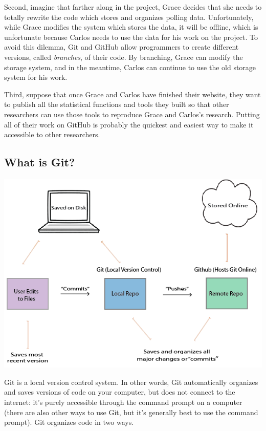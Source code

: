 \documentclass[
]{book}
\begin{document}
Second, imagine that farther along in the project, Grace decides that she needs to totally rewrite the code which stores and organizes polling data. Unfortunately, while Grace modifies the system which stores the data, it will be offline, which is unfortunate because Carlos needs to use the data for his work on the project. To avoid this dilemma, Git and GitHub allow programmers to create different versions, called \emph{branches}, of their code. By branching, Grace can modify the storage system, and in the meantime, Carlos can continue to use the old storage system for his work.

Third, suppose that once Grace and Carlos have finished their website, they want to publish all the statistical functions and tools they built so that other researchers can use those tools to reproduce Grace and Carlos's research. Putting all of their work on GitHub is probably the quickest and easiest way to make it accessible to other researchers.

\hypertarget{what-is-git}{%
\subsection{What is Git?}\label{what-is-git}}

\includegraphics{images/gitgraphic.PNG}

Git is a local version control system. In other words, Git automatically organizes and saves versions of code on your computer, but does not connect to the internet: it's purely accessible through the command prompt on a computer (there are also other ways to use Git, but it's generally best to use the command prompt). Git organizes code in two ways.
\end{document}
